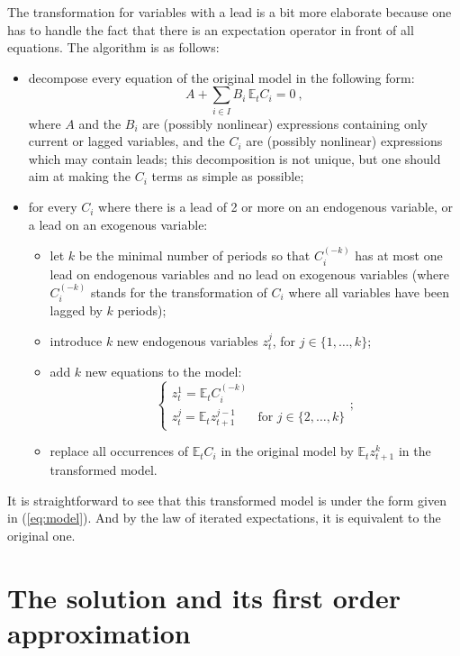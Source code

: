 \documentclass[11pt,a4paper]{article}
\begin{document}
The transformation for variables with a lead is a bit more elaborate because
one has to handle the fact that there is an expectation operator in front of
all equations. The algorithm is as follows:
\begin{itemize}
\item decompose every equation of the original model in the following form:
  \begin{equation*}
    A + \sum_{i\in I} B_i \, \mathbb{E}_t C_i = 0 \: ,
  \end{equation*}
  where $A$ and the $B_i$ are (possibly nonlinear) expressions containing only
  current or lagged variables, and the $C_i$ are (possibly nonlinear)
  expressions which may contain leads; this decomposition is not unique, but
  one should aim at making the $C_i$ terms as simple as possible;
\item for every $C_i$ where there is a lead of 2 or more on an endogenous
  variable, or a lead on an exogenous variable:
  \begin{itemize}
  \item let $k$ be the minimal number of periods so that $C_i^{(-k)}$ has at
    most one lead on endogenous variables and no lead on exogenous variables
    (where $C_i^{(-k)}$ stands for the transformation of $C_i$ where all
    variables have been lagged by $k$ periods);
  \item introduce $k$ new endogenous variables $z^j_t$, for
    $j\in\{1,\ldots,k\}$;
  \item add $k$ new equations to the model:
    \begin{equation*}
      \left\{\begin{array}{ll}
          z^1_t = \mathbb{E}_tC_i^{(-k)} & \\
          z^j_t = \mathbb{E}_tz^{j-1}_{t+1} & \text{for } j\in\{2, \ldots,k\}
        \end{array}\right.;
    \end{equation*}
  \item replace all occurrences of $\mathbb{E}_t C_i$ in the original model
    by $\mathbb{E}_tz^k_{t+1}$ in the transformed model.
  \end{itemize}
\end{itemize}
It is straightforward to see that this transformed model is under the form
given in (\ref{eq:model}). And by the law of iterated expectations, it is
equivalent to the original one.

\section{The solution and its first order approximation}
\label{sec:first-order}
\end{document}
